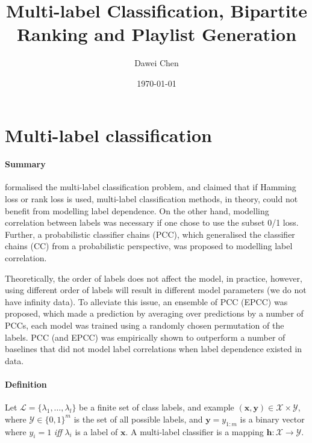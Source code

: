 \documentclass[9pt]{extarticle}
\title{Multi-label Classification, Bipartite Ranking and Playlist Generation}
\author{Dawei Chen}
\date{\today}
\newcommand{\h}{\mathbf{h}}
\newcommand{\x}{\mathbf{x}}
\newcommand{\y}{\mathbf{y}}
\newcommand{\1}{\mathbf{1}}
\newcommand{\LCal}{\mathcal{L}}
\newcommand{\XCal}{\mathcal{X}}
\newcommand{\YCal}{\mathcal{Y}}
\begin{document}
\maketitle

\section{Multi-label classification}
\label{sec:mlc}

\paragraph{Summary}
\citet{cheng:2010} formalised the multi-label classification problem, 
and claimed that if Hamming loss or rank loss is used,
multi-label classification methods, in theory, could not benefit from modelling label dependence.
On the other hand, modelling correlation between labels was necessary if one chose to use the subset 0/1 loss.
Further, a probabilistic classifier chains (PCC), which generalised the classifier chains (CC) from a probabilistic perspective,
was proposed to modelling label correlation. 

Theoretically, the order of labels does not affect the model, 
in practice, however, using different order of labels will result in different model parameters (we do not have infinity data).
To alleviate this issue, an ensemble of PCC (EPCC) was proposed, which made a prediction by averaging over predictions by a number of PCCs, 
each model was trained using a randomly chosen permutation of the labels.
PCC (and EPCC) was empirically shown to outperform a number of baselines that did not model label correlations when label dependence existed in data.


\noindent
\paragraph{Definition}
Let $\LCal = \{\lambda_1,\dots,\lambda_l\}$ be a finite set of class labels,
and example $(\x,\y) \in \XCal \times \YCal$, 
where $\YCal \in \{0,1\}^m$ is the set of all possible labels,
and $\y=y_{1:m}$ is a binary vector where $y_i = 1$ \emph{iff} $\lambda_i$ is a label of $\x$.
A multi-label classifier is a mapping $\h: \XCal \to \YCal$.

\noindent
\end{document}
